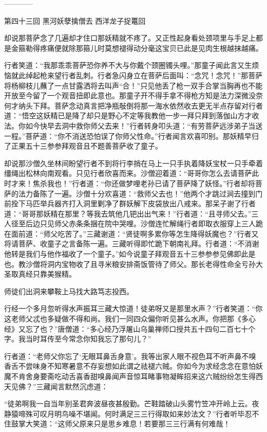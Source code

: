 \documentclass[12pt,UTF8]{ctexbook}
\begin{document}
------------

第四十三回 黑河妖孽擒僧去 西洋龙子捉鼍回

却说那菩萨念了几遍却才住口那妖精就不疼了。又正性起身看处颈项里与手足上都是金箍勒得疼痛便就除那箍儿时莫想褪得动分毫这宝贝已此是见肉生根越抹越痛。

行者笑道：“我那乖乖菩萨恐你养不大与你戴个颈圈镯头哩。”那童子闻此言又生烦恼就此绰起枪来望行者乱刺。行者急闪身立在菩萨后面叫：“念咒！念咒！”那菩萨将杨柳枝儿蘸了一点甘露洒将去叫声“合！”只见他丢了枪一双手合掌当胸再也不能开放至今留了一个观音扭即此意也。那童子开不得手拿不得枪方知是法力深微没奈何才纳头下拜。菩萨念动真言把净瓶敧倒将那一海水依然收去更无半点存留对行者道：“悟空这妖精已是降了却只是野心不定等我教他一步一拜只拜到落伽山方才收法。你如今快早去洞中救你师父去来！”行者转身叩头道：“有劳菩萨远涉弟子当送一程。”菩萨道：“你不消送恐怕误了你师父性命。”行者闻言欢喜叩别。那妖精早归了正果五十三参参拜观音且不题善菩萨收了童子。

却说那沙僧久坐林间盼望行者不到将行李捎在马上一只手执着降妖宝杖一只手牵着缰绳出松林向南观看。只见行者欣喜而来。沙僧迎着道：“哥哥你怎么去请菩萨此时才来！焦杀我也！”行者道：“你还做梦哩老孙已请了菩萨降了妖怪。”行者却将菩萨的法力备陈了一遍。沙僧十分欢喜道：“救师父去也！”他两个才跳过涧去撞到门前拴下马匹举兵器齐打入洞里剿净了群妖解下皮袋放出八戒来。那呆子谢了行者道：“哥哥那妖精在那里？等我去筑他几钯出出气来！”行者道：“且寻师父去。”三人径至后边只见师父赤条条捆在院中哭哩。沙僧连忙解绳行者即取衣服穿上三人跪在面前道：“师父吃苦了。”三藏谢道：“贤徒啊多累你等怎生降得妖魔也？”行者又将请菩萨、收童子之言备陈一遍。三藏听得即忙跪下朝南礼拜。行者道：“不消谢他转是我们与他作福收了一个童子。”如今说童子拜观音五十三参参参见佛即此是也。教沙僧将洞内宝物收了且寻米粮安排斋饭管待了师父。那长老得性命全亏孙大圣取真经只靠美猴精。

师徒们出洞来攀鞍上马找大路笃志投西。

行经一个多月忽听得水声振耳三藏大惊道！徒弟呀又是那里水声？”行者笑道：“你这老师父忒也多疑做不得和尚。我们一同四众偏你听见甚么水声。你把那《多心经》又忘了也？”唐僧道：“多心经乃浮屠山乌巢禅师口授共五十四句二百七十个字。我当时耳传至今常念你知我忘了那句儿？”

行者道：“老师父你忘了‘无眼耳鼻舌身意’。我等出家人眼不视色耳不听声鼻不嗅香舌不尝味身不知寒暑意不存妄想如此谓之祛褪六贼。你如今为求经念念在意怕妖魔不肯舍身要斋吃动舌喜香甜嗅鼻闻声音惊耳睹事物凝眸招来这六贼纷纷怎生得西天见佛？”三藏闻言默然沉虑道：

“徒弟啊我一自当年别圣君奔波昼夜甚殷勤。芒鞋踏破山头雾竹笠冲开岭上云。夜静猿啼殊可叹月明鸟噪不堪闻。何时满足三三行得取如来妙法文？”行者听毕忍不住鼓掌大笑道：“这师父原来只是思乡难息！若要那三三行满有何难哉！
\end{document}
